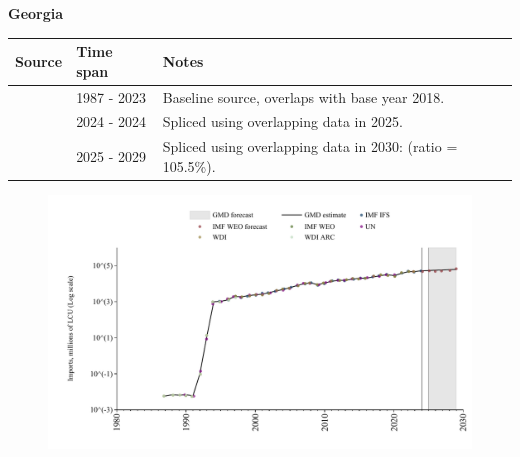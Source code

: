 \documentclass[12pt,a4paper,landscape]{article}
\begin{document}
\begin{adjustbox}{max totalsize={\paperwidth}{\paperheight},center}
\begin{minipage}[t][\textheight][t]{\textwidth}
\vspace*{0.5cm}
{}
\begin{center}
{\Large\bfseries Georgia}
\end{center}
\vspace{0.5cm}
\begin{table}[H]
\centering
\small
\begin{tabular}{|l|l|l|}
\hline
\textbf{Source} & \textbf{Time span} & \textbf{Notes} \\
\hline
\rowcolor{white}\cite{WDI}& 1987 - 2023 &Baseline source, overlaps with base year 2018.\\
\rowcolor{lightgray}\cite{IMF_IFS}& 2024 - 2024 &Spliced using overlapping data in 2025.\\
\rowcolor{white}\cite{IMF_WEO_forecast}& 2025 - 2029 &Spliced using overlapping data in 2030: (ratio = 105.5\%).\\
\hline
\end{tabular}
\end{table}
\begin{figure}[H]
\centering
\includegraphics[width=\textwidth,height=0.6\textheight,keepaspectratio]{graphs/GEO_imports.pdf}
\end{figure}
\end{minipage}
\end{adjustbox}
\end{document}
